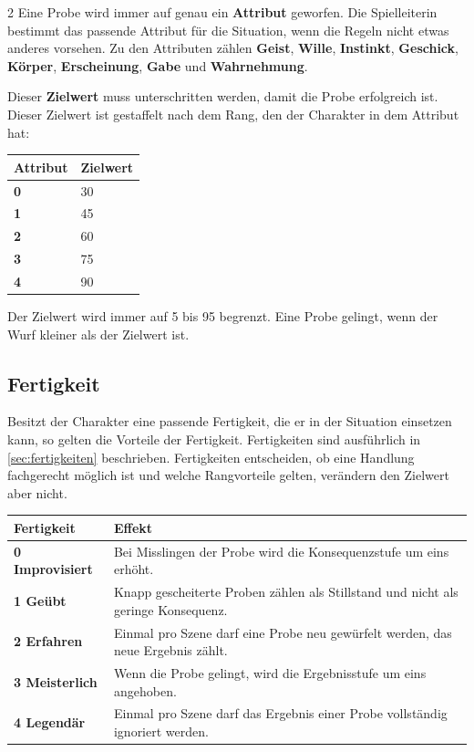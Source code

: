 \begin{multicols*}{2}
Eine Probe wird immer auf genau ein \textbf{Attribut} geworfen.
Die Spielleiterin bestimmt das passende Attribut für die Situation, wenn die Regeln nicht etwas anderes vorsehen.
Zu den Attributen zählen \textbf{Geist}, \textbf{Wille}, \textbf{Instinkt}, \textbf{Geschick}, \textbf{Körper}, \textbf{Erscheinung}, \textbf{Gabe} und \textbf{Wahrnehmung}.


Dieser \textbf{Zielwert} muss unterschritten werden, damit die Probe erfolgreich ist. Dieser Zielwert ist gestaffelt nach dem Rang, den der Charakter in dem Attribut hat:\\

\begin{tabular}{ll}
    \toprule
    \textbf{Attribut}  & \textbf{Zielwert}\\
    \midrule
    \textbf{0}        & 30 \\
    \textbf{1}        & 45 \\
    \textbf{2}        & 60 \\
    \textbf{3}        & 75 \\
    \textbf{4}        & 90 \\
    \bottomrule
\end{tabular}

Der Zielwert wird immer auf 5 bis 95 begrenzt.
Eine Probe gelingt, wenn der Wurf kleiner als der Zielwert ist.

\subsection{Fertigkeit}\label{subsec:probe-fertigkeit}

Besitzt der Charakter eine passende Fertigkeit, die er in der Situation einsetzen kann, so gelten die Vorteile der Fertigkeit. Fertigkeiten sind ausführlich in \cref{sec:fertigkeiten} beschrieben. Fertigkeiten entscheiden, ob eine Handlung fachgerecht möglich ist und welche Rangvorteile gelten, verändern den Zielwert aber nicht.

\begin{tabularx}{\linewidth}{lX}
    \toprule
    \textbf{Fertigkeit}  & \textbf{Effekt}\\
    \midrule
    \textbf{0 Improvisiert}        & Bei Misslingen der Probe wird die Konsequenzstufe um eins erhöht.\\
    \textbf{1 Geübt}        &  Knapp gescheiterte Proben zählen als Stillstand und nicht als geringe Konsequenz.\\
    \textbf{2 Erfahren}        & Einmal pro Szene darf eine Probe neu gewürfelt werden, das neue Ergebnis zählt. \\
    \textbf{3 Meisterlich}        & Wenn die Probe gelingt, wird die Ergebnisstufe um eins angehoben.  \\
    \textbf{4 Legendär}        & Einmal pro Szene darf das Ergebnis einer Probe vollständig ignoriert werden. \\
    \bottomrule
\end{tabularx}


\end{multicols*}
